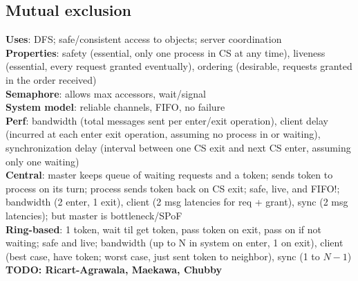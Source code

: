 \documentclass{article}
\begin{document}
\begin{multicols*}{3}
\section{Mutual exclusion}
\textbf{Uses}: DFS; safe/consistent access to objects; server coordination \\
\textbf{Properties}: safety (essential, only one process in CS at any time), liveness (essential, every request granted eventually), ordering (desirable, requests granted in the order received) \\
\textbf{Semaphore}: allows max accessors, wait/signal \\
\textbf{System model}: reliable channels, FIFO, no failure \\
\textbf{Perf}: bandwidth (total messages sent per enter/exit operation), client delay (incurred at each enter exit operation, assuming no process in or waiting), synchronization delay (interval between one CS exit and next CS enter, assuming only one waiting) \\
\textbf{Central}: master keeps queue of waiting requests and a token; sends token to process on its turn; process sends token back on CS exit; safe, live, and FIFO!; bandwidth (2 enter, 1 exit), client (2 msg latencies for req + grant), sync (2 msg latencies); but master is bottleneck/SPoF \\
\textbf{Ring-based}: 1 token, wait til get token, pass token on exit, pass on if not waiting; safe and live; bandwidth (up to N in system on enter, 1 on exit), client (best case, have token; worst case, just sent token to neighbor), sync (1 to $N-1$)
\textbf{TODO: Ricart-Agrawala, Maekawa, Chubby}


\end{multicols*}
\end{document}

